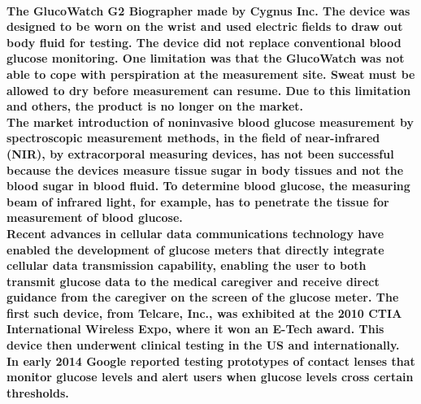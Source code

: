 \documentclass[12pt]{article}
\begin{document}
    \paragraph{The GlucoWatch G2 Biographer made by Cygnus Inc. The device was designed to be worn on the wrist and used electric fields to draw out body fluid for testing. The device did not replace conventional blood glucose monitoring. One limitation was that the GlucoWatch was not able to cope with perspiration at the measurement site. Sweat must be allowed to dry before measurement can resume. Due to this limitation and others, the product is no longer on the market.\\
    The market introduction of noninvasive blood glucose measurement by spectroscopic measurement methods, in the field of near-infrared (NIR), by extracorporal measuring devices, has not been successful because the devices measure tissue sugar in body tissues and not the blood sugar in blood fluid. To determine blood glucose, the measuring beam of infrared light, for example, has to penetrate the tissue for measurement of blood glucose.\\
    Recent advances in cellular data communications technology have enabled the development of glucose meters that directly integrate cellular data transmission capability, enabling the user to both transmit glucose data to the medical caregiver and receive direct guidance from the caregiver on the screen of the glucose meter. The first such device, from Telcare, Inc., was exhibited at the 2010 CTIA International Wireless Expo, where it won an E-Tech award. This device then underwent clinical testing in the US and internationally.\\    
    In early 2014 Google reported testing prototypes of contact lenses that monitor glucose levels and alert users when glucose levels cross certain thresholds.
    }
    
    
      
\end{document}
